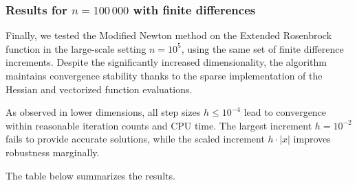 \documentclass[a4paper,12pt]{article}
\begin{document}
	\subsubsection*{Results for $n = 100\,000$ with finite differences}
	
	Finally, we tested the Modified Newton method on the Extended Rosenbrock function in the large-scale setting \( n = 10^5 \), using the same set of finite difference increments. Despite the significantly increased dimensionality, the algorithm maintains convergence stability thanks to the sparse implementation of the Hessian and vectorized function evaluations.
	
	As observed in lower dimensions, all step sizes \( h \leq 10^{-4} \) lead to convergence within reasonable iteration counts and CPU time. The largest increment \( h = 10^{-2} \) fails to provide accurate solutions, while the scaled increment \( h \cdot |x| \) improves robustness marginally.
	
	The table below summarizes the results.
	
\end{document}
